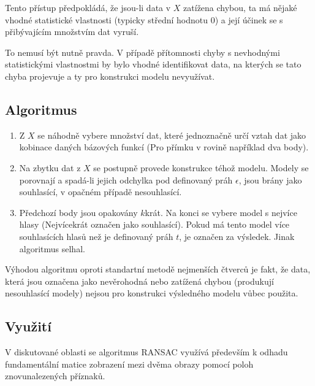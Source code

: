 	Tento přístup předpokládá, že jsou-li data v $X$ zatížena chybou, ta má nějaké vhodné statistické vlastnosti (typicky střední hodnotu 0) a její účinek se s přibývajícím množstvím dat vyruší.
	
	To nemusí být nutně pravda. V případě přítomnosti chyby s nevhodnými statistickými vlastnostmi by bylo vhodné identifikovat data, na kterých se tato chyba projevuje a ty pro konstrukci modelu nevyužívat.
	
	\subsection{Algoritmus}
		
	\begin{enumerate}
		\item Z $X$  se náhodně vybere množství dat, které jednoznačně určí vztah dat jako kobinace daných bázových funkcí (Pro přímku v rovině například dva body).
		\item Na zbytku dat z $X$ se postupně provede konstrukce téhož modelu. Modely se porovnají a spadá-li jejich odchylka pod definovaný práh $\epsilon$, jsou brány jako souhlasící, v opačném případě nesouhlasící.
		\item Předchozí body jsou opakovány $k$krát. Na konci se vybere model s nejvíce hlasy (Nejvícekrát označen jako souhlasící). Pokud má tento model více souhlasících hlasů než je definovaný práh $t$, je označen za výsledek. Jinak algoritmus selhal.
	\end{enumerate}
	
		Výhodou algoritmu oproti standartní metodě nejmenších čtverců je fakt, že data, která jsou označena jako nevěrohodná nebo zatížená chybou (produkují nesouhlasící modely) nejsou pro konstrukci výsledného modelu vůbec použita.
		
	\subsection{Využití}
		V diskutované oblasti se algoritmus RANSAC využívá především k odhadu fundamentální matice zobrazení mezi dvěma obrazy pomocí poloh znovunalezených příznaků.
	